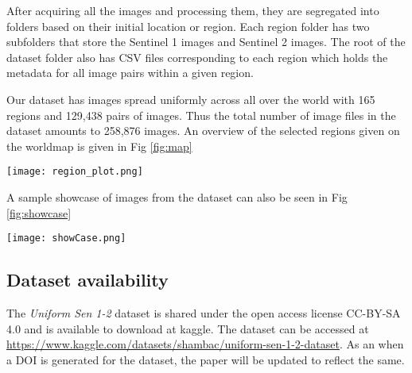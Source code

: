 After acquiring all the images and processing them, they are segregated into folders based on their initial location or region. Each region folder has two subfolders that store the Sentinel 1 images and Sentinel 2 images. The root of the dataset folder also has CSV files corresponding to each region which holds the metadata for all image pairs within a given region.

Our dataset has images spread uniformly across all over the world with 165 regions and 129,438 pairs of images. Thus the total number of image files in the dataset amounts to 258,876 images. An overview of the selected regions given on the worldmap is given in Fig \ref{fig:map}

\begin{figure*}
    \texttt{[image: region\_plot.png]}
    \caption{All regions from where data has been included in the dataset}
    \label{fig:map}
\end{figure*}

A sample showcase of images from the dataset can also be seen in Fig \ref{fig:showcase}

\begin{figure*}
    \texttt{[image: showCase.png]}
    \caption{Sample images from the dataset. Top row: Sentinel-1 images, bottom row: corresponding Sentinel-2 images}
    \label{fig:showcase}
\end{figure*}

\subsection{Dataset availability}
The \textit{Uniform Sen 1-2} dataset is shared under the open access license CC-BY-SA 4.0 and is available to download at kaggle. The dataset can be accessed at \url{https://www.kaggle.com/datasets/shambac/uniform-sen-1-2-dataset}. As an when a DOI is generated for the dataset, the paper will be updated to reflect the same.